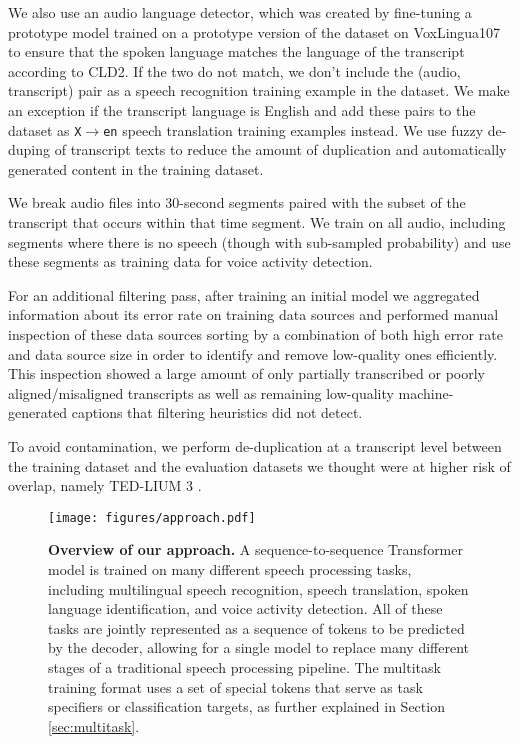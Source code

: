 We also use an audio language detector, which was created by fine-tuning a prototype model trained on a prototype version of the dataset on VoxLingua107 \cite{valk2021voxlingua107} to ensure that the spoken language matches the language of the transcript according to CLD2. If the two do not match, we don't include the (audio, transcript) pair as a speech recognition training example in the dataset. We make an exception if the transcript language is English and add these pairs to the dataset as \texttt{X$\rightarrow$en} speech translation training examples instead. We use fuzzy de-duping of transcript texts to reduce the amount of duplication and automatically generated content in the training dataset.

We break audio files into 30-second segments paired with the subset of the transcript that occurs within that time segment. We train on all audio, including segments where there is no speech (though with sub-sampled probability) and use these segments as training data for voice activity detection.

For an additional filtering pass, after training an initial model we aggregated information about its error rate on training data sources and performed manual inspection of these data sources sorting by a combination of both high error rate and data source size in order to identify and remove low-quality ones efficiently. This inspection showed a large amount of only partially transcribed or poorly aligned/misaligned transcripts as well as remaining low-quality machine-generated captions that filtering heuristics did not detect.

To avoid contamination, we perform de-duplication at a transcript level between the training dataset and the evaluation datasets we thought were at higher risk of overlap, namely TED-LIUM 3 \cite{Hernandez2018TEDLIUM3T}.

\begin{figure*}[t]
\begin{center}
\centerline{\texttt{[image: figures/approach.pdf]}}
\caption{\textbf{Overview of our approach.} A sequence-to-sequence Transformer model is trained on many different speech processing tasks, including multilingual speech recognition, speech translation, spoken language identification, and voice activity detection. All of these tasks are jointly represented as a sequence of tokens to be predicted by the decoder, allowing for a single model to replace many different stages of a traditional speech processing pipeline. The multitask training format uses a set of special tokens that serve as task specifiers or classification targets, as further explained in Section \ref{sec:multitask}.}
\label{fig:approach}
\end{center}
\vspace{-1em}
\end{figure*}

